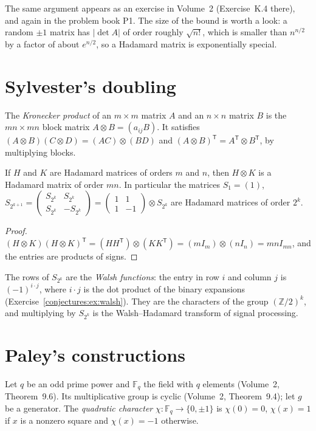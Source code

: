 The same argument appears as an exercise in Volume~2 (Exercise~K.4 there), and again in the problem book P1. The
size of the bound is worth a look: a random $\pm1$ matrix has $|\det A|$ of order roughly $\sqrt{n!}$, which is smaller than $n^{n/2}$ by a factor
of about $e^{n/2}$, so a Hadamard matrix is exponentially special.

\section{Sylvester's doubling}

The \emph{Kronecker product} of an $m\times m$ matrix $A$ and an $n\times n$ matrix $B$ is the $mn\times mn$ block matrix $A\otimes B=(a_{ij}B)$. It
satisfies $(A\otimes B)(C\otimes D)=(AC)\otimes(BD)$ and $(A\otimes B)^{\mathsf T}=A^{\mathsf T}\otimes B^{\mathsf T}$, by multiplying blocks.

\begin{proposition}[Sylvester, 1867]\label{conjectures:prop:kron}
If $H$ and $K$ are Hadamard matrices of orders $m$ and $n$, then $H\otimes K$ is a Hadamard matrix of order $mn$. In particular the matrices
$S_1=(1)$, $S_{2^{k+1}}=\begin{pmatrix}S_{2^k}&S_{2^k}\\S_{2^k}&-S_{2^k}\end{pmatrix}=\begin{pmatrix}1&1\\1&-1\end{pmatrix}\otimes S_{2^k}$ are
Hadamard matrices of order $2^k$.
\end{proposition}
\begin{proof}
$(H\otimes K)(H\otimes K)^{\mathsf T}=(HH^{\mathsf T})\otimes(KK^{\mathsf T})=(mI_m)\otimes(nI_n)=mnI_{mn}$, and the entries are products of signs.
\end{proof}

The rows of $S_{2^k}$ are the \emph{Walsh functions}: the entry in row $i$ and column $j$ is $(-1)^{i\cdot j}$, where $i\cdot j$ is the dot product of
the binary expansions (Exercise~\ref{conjectures:ex:walsh}). They are the characters of the group $(\mathbb Z/2)^k$, and multiplying by $S_{2^k}$ is the
Walsh--Hadamard transform of signal processing.

\section{Paley's constructions}

Let $q$ be an odd prime power and $\mathbb F_q$ the field with $q$ elements (Volume~2, Theorem~9.6). Its multiplicative group is cyclic (Volume~2,
Theorem~9.4); let $g$ be a generator. The \emph{quadratic character} $\chi:\mathbb F_q\to\{0,\pm1\}$ is $\chi(0)=0$, $\chi(x)=1$ if $x$ is a nonzero
square and $\chi(x)=-1$ otherwise.

